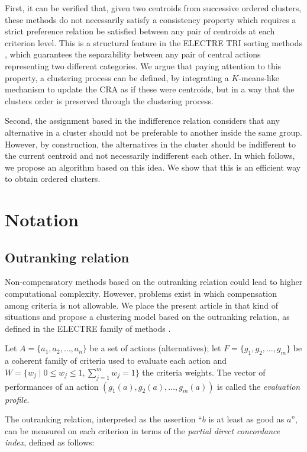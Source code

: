 \documentclass[]{elsarticle}
\theoremstyle{definition}
\begin{document}
First, it can be verified that, given two centroids from successive ordered clusters, these methods do not necessarily satisfy  a consistency property which requires a strict preference relation be satisfied between any pair of centroids at each criterion level.  This is a structural feature in the ELECTRE TRI sorting methods \citep{roy2012}, which guarantees the separability between any pair of central actions representing two different categories. We argue that paying attention to this property, a clustering process can be defined, by integrating a $K$-means-like mechanism to update the CRA as if these were centroids, but in a way that the clusters order is preserved through the clustering process. 

Second, the assignment based in the indifference relation considers that any  alternative in a cluster should not be preferable to another inside the same group.   However, by construction, the alternatives in the cluster should be indifferent to the current centroid and not necessarily indifferent each other.  In which follows, we propose an algorithm based on this idea.  We show that this is an efficient way to obtain ordered clusters.


\section{Notation}\label{notation}

\subsection{Outranking relation}\label{classification}

Non-compensatory methods based on the outranking relation could lead to higher computational complexity. However, problems exist in which compensation among criteria is not allowable. We place the present article in that kind of situations and propose a clustering model based on the outranking relation, as defined in the ELECTRE family of methods \citep{figueira2010}.

Let $A=\{a_1,a_2,\ldots,a_n\}$ be a set of actions (alternatives);  let $F=\{g_1,g_2,\ldots,g_m\}$ be a coherent family of criteria used to evaluate each action and $W=\{w_j \mid 0 \leq w_j \leq 1, \sum_{j=1}^m w_j =1\}$ the criteria weights.  The vector of performances of an action  $(g_1(a),g_2(a),\ldots,g_m(a))$   is called the \emph{evaluation profile}. 



The outranking relation, interpreted as the assertion ``$b$ is at least as good as $a$'',  can be measured on each criterion in terms of  the \emph{partial direct concordance index}, defined as follows: 
\end{document}
